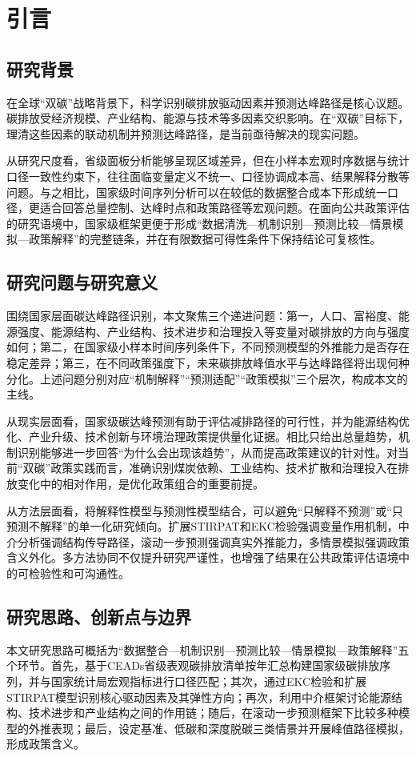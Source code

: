 \section{引言}
\subsection{研究背景}
在全球“双碳”战略背景下，科学识别碳排放驱动因素并预测达峰路径是核心议题。碳排放受经济规模、产业结构、能源与技术等多因素交织影响。在“双碳”目标下，理清这些因素的联动机制并预测达峰路径，是当前亟待解决的现实问题。

从研究尺度看，省级面板分析能够呈现区域差异，但在小样本宏观时序数据与统计口径一致性约束下，往往面临变量定义不统一、口径协调成本高、结果解释分散等问题。与之相比，国家级时间序列分析可以在较低的数据整合成本下形成统一口径，更适合回答总量控制、达峰时点和政策路径等宏观问题。在面向公共政策评估的研究语境中，国家级框架更便于形成“数据清洗—机制识别—预测比较—情景模拟—政策解释”的完整链条，并在有限数据可得性条件下保持结论可复核性。

\subsection{研究问题与研究意义}
围绕国家层面碳达峰路径识别，本文聚焦三个递进问题：第一，人口、富裕度、能源强度、能源结构、产业结构、技术进步和治理投入等变量对碳排放的方向与强度如何；第二，在国家级小样本时间序列条件下，不同预测模型的外推能力是否存在稳定差异；第三，在不同政策强度下，未来碳排放峰值水平与达峰路径将出现何种分化。上述问题分别对应“机制解释”“预测适配”“政策模拟”三个层次，构成本文的主线。

从现实层面看，国家级碳达峰预测有助于评估减排路径的可行性，并为能源结构优化、产业升级、技术创新与环境治理政策提供量化证据。相比只给出总量趋势，机制识别能够进一步回答“为什么会出现该趋势”，从而提高政策建议的针对性。对当前“双碳”政策实践而言，准确识别煤炭依赖、工业结构、技术扩散和治理投入在排放变化中的相对作用，是优化政策组合的重要前提。

从方法层面看，将解释性模型与预测性模型结合，可以避免“只解释不预测”或“只预测不解释”的单一化研究倾向。扩展STIRPAT和EKC检验强调变量作用机制，中介分析强调结构传导路径，滚动一步预测强调真实外推能力，多情景模拟强调政策含义外化。多方法协同不仅提升研究严谨性，也增强了结果在公共政策评估语境中的可检验性和可沟通性。

\subsection{研究思路、创新点与边界}
本文研究思路可概括为“数据整合—机制识别—预测比较—情景模拟—政策解释”五个环节。首先，基于CEADs省级表观碳排放清单按年汇总构建国家级碳排放序列，并与国家统计局宏观指标进行口径匹配；其次，通过EKC检验和扩展STIRPAT模型识别核心驱动因素及其弹性方向；再次，利用中介框架讨论能源结构、技术进步和产业结构之间的作用链；随后，在滚动一步预测框架下比较多种模型的外推表现；最后，设定基准、低碳和深度脱碳三类情景并开展峰值路径模拟，形成政策含义。

